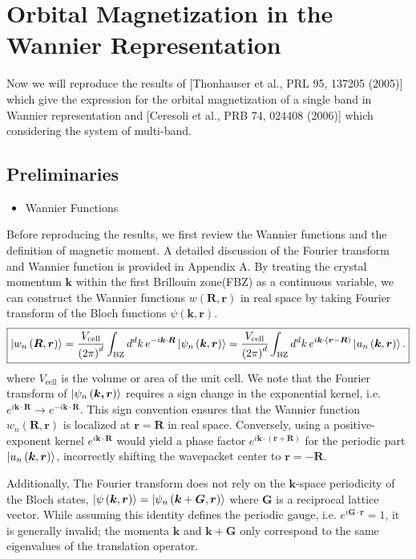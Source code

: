\documentclass[12pt, oneside]{article}
\newcommand{\mr}[1]{\mathrm{#1}}
\newcommand{\p}[1]{\left(#1\right)}
\numberwithin{equation}{subsection}
\begin{document}
\section{Orbital Magnetization in the Wannier Representation}
Now we will reproduce the results of [Thonhauser et al., PRL 95, 137205 (2005)] which give the expression for the orbital magnetization of a single band in Wannier representation and [Ceresoli et al., PRB 74, 024408 (2006)] which considering the system of multi-band.

\subsection{Preliminaries}
\begin{itemize}
	\item Wannier Functions
\end{itemize}
Before reproducing the results, we first review the Wannier functions and the definition of magnetic moment. A detailed discussion of the Fourier transform and Wannier function is provided in Appendix A. By treating the crystal momentum \(\bm{k}\) within the first Brillouin zone(FBZ) as a continuous variable, we can construct the Wannier functions  \(w \p{\bm{R}, \bm{r}}\) in real space by taking Fourier transform of the Bloch functions \(\psi \p{\bm{k}, \bm{r}}\).  
\begin{align}
	\boxed{
		\ket{w_{n} \p{\bm{R}, \bm{r}}} = \frac{V_{\mr{cell}}}{\p{2 \pi}^{d}} \int_{\mr{BZ}} d^d k\, e^{-i \bm{k} \cdot \bm{R}} \ket{\psi_{n} \p{\bm{k}, \bm{r}}} = \frac{V_{\mr{cell}}}{\p{2 \pi}^{d}} \int_{\mr{BZ}} d^d k\, e^{i \bm{k} \cdot \p{\bm{r} - \bm{R}}} \ket{u_n \p{\bm{k}, \bm{r}}}.
	}
\end{align}
where \(V_{\mr{cell}}\) is the volume or area of the unit cell. We note that the Fourier transform of \(\ket{\psi_n \p{\bm{k,\bm{r}}}}\) requires a sign change in the exponential kernel, i.e. \( e^{i \bm{k} \cdot \bm{R}} \rightarrow  e^{ - i \bm{k} \cdot \bm{\bm{R}}}\). This sign convention ensures that the Wannier function \(w_n \p{\bm{R}, \bm{r}}\) is localized at \(\bm{r} = \bm{R}\) in real space. Conversely, using a positive-exponent kernel \(e^{i \bm{k} \cdot \bm{R}}\) would yield a phase factor \(e^{i \bm{k} \cdot \p{\bm{r} + \bm{R}}}\) for the periodic part \(\ket{u_n \p{\bm{k},\bm{r}}}\), incorrectly shifting the wavepacket center to \(\bm{r} = -\bm{R}\).

Additionally, The Fourier transform does not rely on the \(\bm{k}\)-space periodicity of the Bloch states, \(\ket{\psi \p{\bm{k}, \bm{r}}} = \ket{\psi_{n} \p{\bm{k} + \bm{G}, \bm{r}}} \) where \(\bm{G}\) is a reciprocal lattice vector. While assuming this identity defines the periodic gauge, i.e. \(e^{i \bm{G} \cdot \bm{r}} = 1\), it is generally invalid; the momenta \(\bm{k}\) and \(\bm{k} + \bm{G}\) only correspond to the same eigenvalues of the translation operator.
\end{document}
